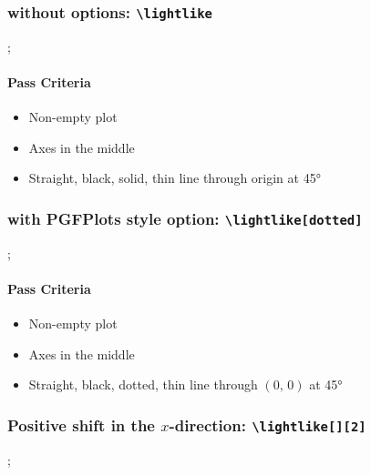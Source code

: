 \documentclass[pagesize,headsepline,parskip=half]{scrartcl}
\begin{document}
        \subsubsection{without options: \texttt{\textbackslash{}lightlike}}
          \begin{spacetimediagram}[grid]
            \lightlike;
          \end{spacetimediagram}

          \paragraph{Pass Criteria}
            \begin{itemize}
              \item Non-empty plot
              \item Axes in the middle
              \item Straight, black, solid, thin line through origin at 45°
            \end{itemize}

        \subsubsection{with PGFPlots style option: \texttt{\textbackslash{}lightlike[dotted]}}
          \begin{spacetimediagram}[grid]
            \lightlike[dotted];
          \end{spacetimediagram}

          \paragraph{Pass Criteria}
            \begin{itemize}
              \item Non-empty plot
              \item Axes in the middle
              \item Straight, black, dotted, thin line through $(0, \, 0)$ at 45°
            \end{itemize}

          \subsubsection{Positive shift in the $x$-direction: \texttt{\textbackslash{}lightlike[][2]}}
            \begin{spacetimediagram}
              \lightlike[][2];
            \end{spacetimediagram}
\end{document}
